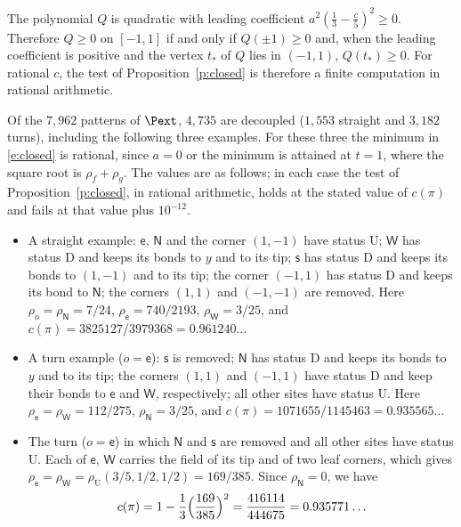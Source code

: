 The polynomial $Q$ is quadratic with leading coefficient $a^2 (\frac13 - \frac c5)^2 \ge 0$. Therefore $Q \ge 0$ on $[-1, 1]$ if and only if $Q(\pm 1) \ge 0$ and, when the leading coefficient is positive and the vertex $t_*$ of $Q$ lies in $(-1, 1)$, $Q(t_*) \ge 0$. For rational $c$, the test of Proposition~\ref{p:closed} is therefore a finite computation in rational arithmetic.

Of the $7{,}962$ patterns of $\Pext$, $4{,}735$ are decoupled ($1{,}553$ straight and $3{,}182$ turns), including the following three examples. For these three the minimum in \eqref{e:closed} is rational, since $a = 0$ or the minimum is attained at $t = 1$, where the square root is $\rho_f + \rho_g$. The values are as follows; in each case the test of Proposition~\ref{p:closed}, in rational arithmetic, holds at the stated value of $c(\pi)$ and fails at that value plus $10^{-12}$.
\begin{itemize}
\item A straight example: $\mathsf e$, $\mathsf N$ and the corner $(1, -1)$ have status $\mathrm U$; $\mathsf W$ has status $\mathrm D$ and keeps its bonds to $y$ and to its tip; $\mathsf s$ has status $\mathrm D$ and keeps its bonds to $(1, -1)$ and to its tip; the corner $(-1, 1)$ has status $\mathrm D$ and keeps its bond to $\mathsf N$; the corners $(1, 1)$ and $(-1, -1)$ are removed. Here $\rho_o = \rho_{\mathsf N} = 7/24$, $\rho_{\mathsf e} = 740/2193$, $\rho_{\mathsf W} = 3/25$, and $c(\pi) = 3825127/3979368 = 0.961240\ldots$
\item A turn example ($o = \mathsf e$): $\mathsf s$ is removed; $\mathsf N$ has status $\mathrm D$ and keeps its bonds to $y$ and to its tip; the corners $(1, 1)$ and $(-1, 1)$ have status $\mathrm D$ and keep their bonds to $\mathsf e$ and $\mathsf W$, respectively; all other sites have status $\mathrm U$. Here $\rho_{\mathsf e} = \rho_{\mathsf W} = 112/275$, $\rho_{\mathsf N} = 3/25$, and $c(\pi) = 1071655/1145463 = 0.935565\ldots$
\item The turn ($o = \mathsf e$) in which $\mathsf N$ and $\mathsf s$ are removed and all other sites have status $\mathrm U$. Each of $\mathsf e$, $\mathsf W$ carries the field of its tip and of two leaf corners, which gives $\rho_{\mathsf e} = \rho_{\mathsf W} = \rho_{\mathrm U}(3/5, 1/2, 1/2) = 169/385$. Since $\rho_{\mathsf N} = 0$, we have
\begin{equation}\label{e:5469}
c(\pi) = 1 - \frac13 \Bigl( \frac{169}{385} \Bigr)^2 = \frac{416114}{444675} = 0.935771\ldots
\end{equation}
\end{itemize}

